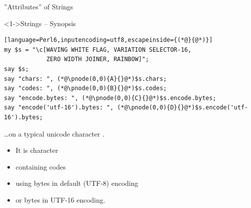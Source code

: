 \begin{frame}[fragile]{''Attributes'' of Strings}
\begin{block}<1->{Strings -- Synopsis}
\small
\begin{lstlisting}[language=Perl6,inputencoding=utf8,escapeinside={(*@}{@*)}]
my $s = "\c[WAVING WHITE FLAG, VARIATION SELECTOR-16,
            ZERO WIDTH JOINER, RAINBOW]";
say $s;
say "chars: ", (*@\pnode(0,0){A}{}@*)$s.chars;
say "codes: ", (*@\pnode(0,0){B}{}@*)$s.codes;
say "encode.bytes: ", (*@\pnode(0,0){C}{}@*)$s.encode.bytes;
say "encode('utf-16').bytes: ", (*@\pnode(0,0){D}{}@*)$s.encode('utf-16').bytes;
\end{lstlisting}
\end{block}

\ldots on a typical unicode character .
\begin{itemize}
\item<3-> It is \texttt{} character
\item<4-> containing \texttt{} codes
\item<5-> using \texttt{} bytes in default (UTF-8) encoding
\item<6-> or \texttt{} bytes in UTF-16 encoding.
\end{itemize}
\end{frame}

